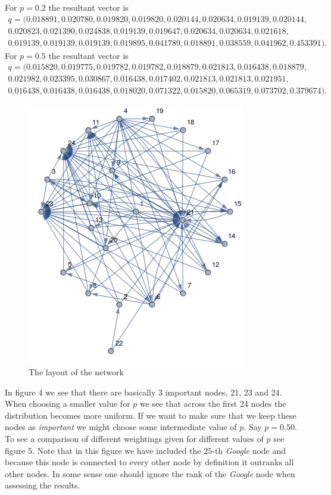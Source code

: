 \documentclass{unswmaths}
\begin{document}
For $ p = 0.2 $ the resultant vector is
\begin{align*}
    q = (
   0.018891,
   0.020780,
   0.019820,
   0.019820,
   0.020144,
   0.020634,
   0.019139,
   0.020144, \\
   0.020823,
   0.021390,
   0.024838,
   0.019139,
   0.019647,
   0.020634,
   0.020634,
   0.021618, \\
   0.019139,
   0.019139,
   0.019139,
   0.019895,
   0.041789,
   0.018891,
   0.038559,
   0.041962,
   0.453391 
).
\end{align*}
For $ p = 0.5 $ the resultant vector is
\begin{align*}
    q = (
   0.015820,
   0.019775,
   0.019782,
   0.019782,
   0.018879,
   0.021813,
   0.016438,
   0.018879, \\
   0.021982,
   0.023395,
   0.030867,
   0.016438,
   0.017402,
   0.021813,
   0.021813,
   0.021951, \\
   0.016438,
   0.016438,
   0.016438,
   0.018020,
   0.071322,
   0.015820,
   0.065319,
   0.073702,
   0.379674 
).
\end{align*}
\begin{figure}[h]
    \includegraphics[scale=0.8]{Graph}
    \caption{The layout of the network}
\end{figure}
In figure 4 we see that there are basically 3 important nodes, 21, 23 and 24. When choosing a smaller value for $ p $  we see that across the first 24 nodes the distribution becomes more uniform. If we want to make sure that we keep these nodes as \emph{important} we might choose some intermediate value of $ p $. Say $ p = 0.50 $.
To see a comparison of different weightings given for different values of $ p $ see figure 5. Note that in this figure we have included the $25$-th \emph{Google} node and because this node is connected to every other node by definition it outranks all other nodes. In some sense one should ignore the rank of the \emph{Google} node when assessing the results.
\end{document}
